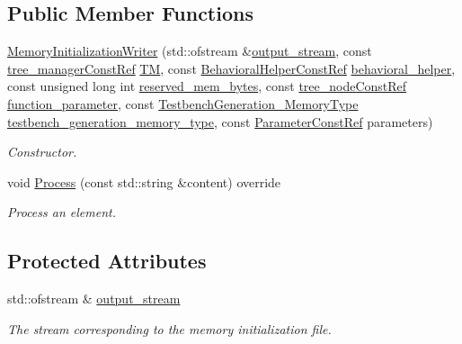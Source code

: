 \subsection*{Public Member Functions}
\begin{DoxyCompactItemize}
\item 
\hyperlink{classMemoryInitializationWriter_ad0980c4a848a1427036007ca9b299f21}{Memory\+Initialization\+Writer} (std\+::ofstream \&\hyperlink{classMemoryInitializationWriter_aa7aba789c5f4692832a725b497941c1e}{output\+\_\+stream}, const \hyperlink{tree__manager_8hpp_a792e3f1f892d7d997a8d8a4a12e39346}{tree\+\_\+manager\+Const\+Ref} \hyperlink{classMemoryInitializationWriterBase_ad7639a9140b8d5c42c2c0c4255ad4cbf}{TM}, const \hyperlink{behavioral__helper_8hpp_aae973b54cac87eef3b27442aa3e1e425}{Behavioral\+Helper\+Const\+Ref} \hyperlink{classMemoryInitializationWriterBase_ae5f60dc91641447c00b023836743b6b3}{behavioral\+\_\+helper}, const unsigned long int \hyperlink{classMemoryInitializationWriterBase_ac424618ba0c88d441a905b6cbf891b65}{reserved\+\_\+mem\+\_\+bytes}, const \hyperlink{tree__node_8hpp_a3cf5d02292c940f3892425a5b5fdec3c}{tree\+\_\+node\+Const\+Ref} \hyperlink{classMemoryInitializationWriterBase_a2bdd8c25a0b756f6290cb48a6b9d0303}{function\+\_\+parameter}, const \hyperlink{testbench__generation_8hpp_ad84688161fffbe7da2fc2b9a39b93198}{Testbench\+Generation\+\_\+\+Memory\+Type} \hyperlink{classMemoryInitializationWriterBase_ac4f718dfd59eddbc0adf75e98b227ccb}{testbench\+\_\+generation\+\_\+memory\+\_\+type}, const \hyperlink{Parameter_8hpp_a37841774a6fcb479b597fdf8955eb4ea}{Parameter\+Const\+Ref} parameters)
\begin{DoxyCompactList}\small\item\em Constructor. \end{DoxyCompactList}\item 
void \hyperlink{classMemoryInitializationWriter_a7a4a0905d7608fefb20b426df5a845aa}{Process} (const std\+::string \&content) override
\begin{DoxyCompactList}\small\item\em Process an element. \end{DoxyCompactList}\end{DoxyCompactItemize}
\subsection*{Protected Attributes}
\begin{DoxyCompactItemize}
\item 
std\+::ofstream \& \hyperlink{classMemoryInitializationWriter_aa7aba789c5f4692832a725b497941c1e}{output\+\_\+stream}
\begin{DoxyCompactList}\small\item\em The stream corresponding to the memory initialization file. \end{DoxyCompactList}\end{DoxyCompactItemize}
